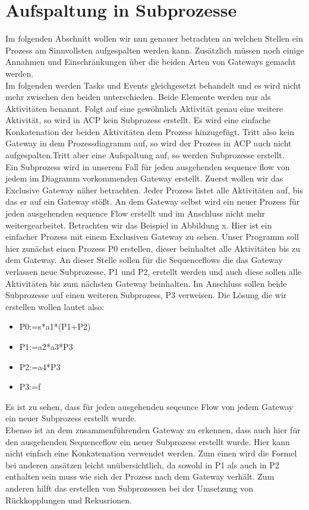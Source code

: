 \section {Aufspaltung in Subprozesse}
Im folgenden Abschnitt wollen wir nun genauer betrachten an welchen Stellen ein Prozess am Sinnvollsten aufgespalten werden kann. Zusätzlich müssen noch einige Annahmen und Einschränkungen über die beiden Arten von Gateways gemacht werden.\\
Im folgenden werden Tasks und Events gleichgesetzt behandelt und es wird nicht mehr zwischen den beiden unterschieden. Beide Elemente werden nur als Aktivitäten benannt. Folgt auf eine gewöhnlich Aktivität genau eine weitere Aktivität, so wird in ACP kein Subprozess erstellt. Es wird eine einfache Konkatenation der beiden Aktivitäten dem Prozess hinzugefügt. Tritt also kein Gateway in dem Prozessdiagramm auf, so wird der Prozess in ACP auch nicht aufgespalten.Tritt aber eine Aufspaltung auf, so werden Subprozesse erstellt.\\
Ein Subprozess wird in unserem Fall für jeden ausgehenden sequence flow von jedem im Diagramm vorkommenden Gateway erstellt. Zuerst wollen wir das Exclusive Gateway näher betrachten. Jeder Prozess listet alle Aktivitäten auf, bis das er auf ein Gateway stößt. An dem Gateway selbst wird ein neuer Prozess für jeden ausgehenden sequence Flow erstellt und im Anschluss nicht mehr weitergearbeitet. Betrachten wir das Beispiel in Abbildung x. Hier ist ein einfacher Prozess mit einem Exclusiven Gateway zu sehen. Unser Programm soll hier zunächst einen Prozess P0 erstellen, dieser beinhaltet alle Aktivitäten bis zu dem Gateway. An dieser Stelle sollen für die Sequenceflows die das Gateway verlassen neue Subprozesse, P1 und P2, erstellt werden und auch diese sollen alle Aktivitäten bis zum nächsten Gateway beinhalten. Im Anschluss sollen beide Subprozesse auf einen weiteren Subprozess, P3 verweisen. Die Lösung die wir erstellen wollen lautet also:\\
\begin{itemize}
\item P0:=s*a1*(P1+P2)
\item P1:=a2*a3*P3
\item P2:=a4*P3
\item P3:=f
\end{itemize}
Es ist zu sehen, dass für jeden ausgehenden seqeunce Flow von jedem Gateway ein neuer Subprozess erstellt wurde.\\ 
Ebenso ist an dem zusammenführenden Gateway zu erkennen, dass auch hier für den ausgehenden Sequenceflow ein neuer Subprozess erstellt wurde. Hier kann nicht einfach eine Konkatenation verwendet werden. Zum einen wird die Formel bei anderen ansätzen leicht unübersichtlich, da sowohl in P1 als auch in P2 enthalten sein muss wie sich der Prozess nach dem Gateway verhält. Zum anderen hilft das erstellen von Subprozessen bei der Umsetzung von Rückkopplungen und Rekusrionen.\\
